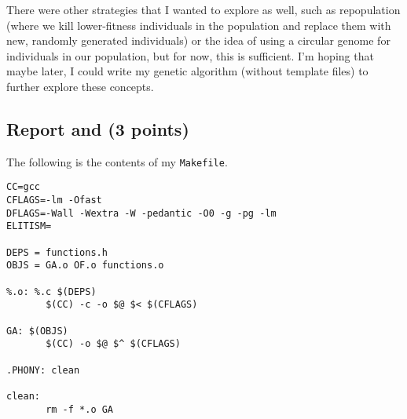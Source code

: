 \documentclass[12pt]{article}
\begin{document}
    There were other strategies that I wanted to explore as well, such as repopulation (where we kill lower-fitness individuals in the population and replace them with new, randomly generated individuals) or the idea of using a circular genome for individuals in our population, but for now, this is sufficient. I'm hoping that maybe later, I could write my genetic algorithm (without template files) to further explore these concepts.
    
    \newpage
	
	\subsection{Report and  (3 points)}
	
	The following is the contents of my \verb|Makefile|.

    \begin{lstlisting}
CC=gcc
CFLAGS=-lm -Ofast
DFLAGS=-Wall -Wextra -W -pedantic -O0 -g -pg -lm
ELITISM=

DEPS = functions.h
OBJS = GA.o OF.o functions.o

%.o: %.c $(DEPS)
	   $(CC) -c -o $@ $< $(CFLAGS)

GA: $(OBJS)
	   $(CC) -o $@ $^ $(CFLAGS)

.PHONY: clean

clean:
	   rm -f *.o GA
    \end{lstlisting}
\end{document}
